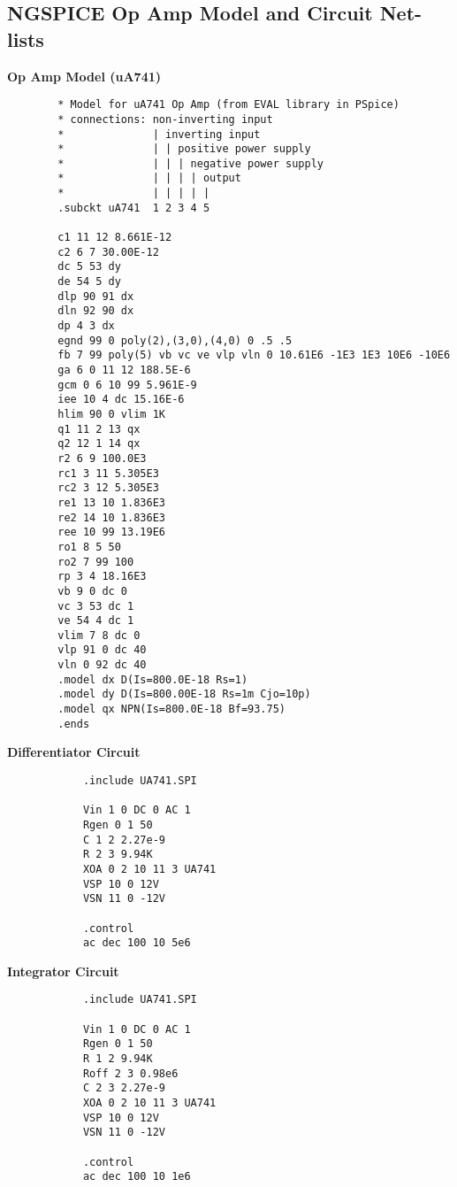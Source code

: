 \subsection*{NGSPICE Op Amp Model and Circuit Net-lists}
    \textbf{Op Amp Model (uA741)}
	\begin{verbatim}
		* Model for uA741 Op Amp (from EVAL library in PSpice)
		* connections: non-inverting input
		*              | inverting input
		*              | | positive power supply
		*              | | | negative power supply
		*              | | | | output
		*              | | | | |
		.subckt uA741  1 2 3 4 5
		
		c1 11 12 8.661E-12
		c2 6 7 30.00E-12
		dc 5 53 dy
		de 54 5 dy
		dlp 90 91 dx
		dln 92 90 dx
		dp 4 3 dx
		egnd 99 0 poly(2),(3,0),(4,0) 0 .5 .5
		fb 7 99 poly(5) vb vc ve vlp vln 0 10.61E6 -1E3 1E3 10E6 -10E6
		ga 6 0 11 12 188.5E-6
		gcm 0 6 10 99 5.961E-9
		iee 10 4 dc 15.16E-6
		hlim 90 0 vlim 1K
		q1 11 2 13 qx
		q2 12 1 14 qx
		r2 6 9 100.0E3
		rc1 3 11 5.305E3
		rc2 3 12 5.305E3
		re1 13 10 1.836E3
		re2 14 10 1.836E3
		ree 10 99 13.19E6
		ro1 8 5 50
		ro2 7 99 100
		rp 3 4 18.16E3
		vb 9 0 dc 0
		vc 3 53 dc 1
		ve 54 4 dc 1
		vlim 7 8 dc 0
		vlp 91 0 dc 40
		vln 0 92 dc 40
		.model dx D(Is=800.0E-18 Rs=1)
		.model dy D(Is=800.00E-18 Rs=1m Cjo=10p)
		.model qx NPN(Is=800.0E-18 Bf=93.75)
		.ends
	\end{verbatim}

	\begin{minipage}{0.5\textwidth}
		\textbf{Differentiator Circuit}
		\begin{verbatim}
			.include UA741.SPI

			Vin 1 0 DC 0 AC 1 
			Rgen 0 1 50
			C 1 2 2.27e-9
			R 2 3 9.94K
			XOA 0 2 10 11 3 UA741
			VSP 10 0 12V
			VSN 11 0 -12V

			.control
			ac dec 100 10 5e6
		\end{verbatim}
	\end{minipage}%
	\begin{minipage}{0.5\textwidth}
		\textbf{Integrator Circuit}
		\begin{verbatim}
			.include UA741.SPI

			Vin 1 0 DC 0 AC 1 
			Rgen 0 1 50
			R 1 2 9.94K
			Roff 2 3 0.98e6
			C 2 3 2.27e-9
			XOA 0 2 10 11 3 UA741
			VSP 10 0 12V
			VSN 11 0 -12V

			.control
			ac dec 100 10 1e6
		\end{verbatim}
	\end{minipage}
